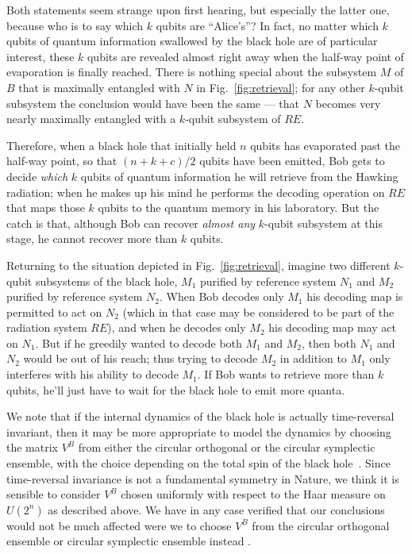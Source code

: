 \documentclass[12pt]{article}
\begin{document}
Both statements seem strange upon first hearing, but especially the latter one, because who is to say which $k$ qubits are ``Alice's''? In fact, no matter which $k$ qubits of quantum information swallowed by the black hole are of particular interest, these $k$ qubits are revealed almost right away when the half-way point of evaporation is finally reached. There is nothing special about the subsystem $M$ of $B$ that is maximally entangled with $N$ in Fig.~\ref{fig:retrieval}; for any other $k$-qubit subsystem the conclusion would have been the same --- that $N$ becomes very nearly maximally entangled with a $k$-qubit subsystem of $RE$. 

Therefore, when a black hole that initially held $n$ qubits has evaporated past the half-way point, so that $(n+k+c)/2$ qubits have been emitted, Bob gets to decide {\em which} $k$ qubits of quantum information he will retrieve from the Hawking radiation;  when he makes up his mind he performs the decoding operation on $RE$ that maps those $k$ qubits to the quantum memory in his laboratory. But the catch is that, although Bob can recover {\em almost any} $k$-qubit subsystem at this stage, he cannot recover more than $k$ qubits. 

Returning to the situation depicted in Fig.~\ref{fig:retrieval}, imagine two different $k$-qubit subsystems of the black hole, $M_1$ purified by reference system $N_1$ and $M_2$ purified by reference system $N_2$. When Bob decodes only $M_1$ his decoding map is permitted to act on $N_2$ (which in that case may be considered to be part of the radiation system $RE$), and when he decodes only $M_2$ his decoding map may act on $N_1$. But if he greedily wanted to decode both $M_1$ and $M_2$, then both $N_1$ and $N_2$ would be out of his reach; thus trying to decode $M_2$ in addition to $M_1$ only interferes with his ability to decode $M_1$. If Bob wants to retrieve more than $k$ qubits, he'll just have to wait for the black hole to emit more quanta.

We note that if the internal dynamics of the black hole is actually
time-reversal invariant, then it may be more appropriate to model the
dynamics by choosing the matrix $V^B$ from either the circular orthogonal
or the circular symplectic ensemble, with the choice depending on the
total spin of the black hole~\cite{mehta}.  Since time-reversal invariance
is not a fundamental symmetry in Nature, we think it is sensible to
consider $V^B$ chosen uniformly with respect to the Haar measure on
$U(2^n)$ as described above. We have in any case verified that our
conclusions would not be much affected were we to choose $V^B$ from the
circular orthogonal ensemble or circular symplectic ensemble instead \cite{anderson}.
\end{document}
